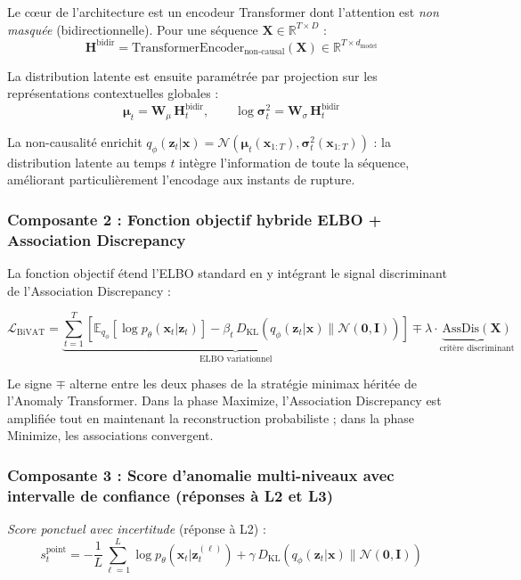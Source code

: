 \documentclass[12pt,a4paper]{article}
\begin{document}
Le cœur de l'architecture est un encodeur Transformer dont l'attention est \textit{non masquée} (bidirectionnelle). Pour une séquence $\mathbf{X} \in \mathbb{R}^{T \times D}$ :
$$\mathbf{H}^{\mathrm{bidir}} = \mathrm{TransformerEncoder}_{\mathrm{non\text{-}causal}}(\mathbf{X}) \in \mathbb{R}^{T \times d_{\mathrm{model}}}$$

La distribution latente est ensuite paramétrée par projection sur les représentations contextuelles globales :
$$\boldsymbol{\mu}_t = \mathbf{W}_\mu\,\mathbf{H}^{\mathrm{bidir}}_t, \qquad \log\boldsymbol{\sigma}^2_t = \mathbf{W}_\sigma\,\mathbf{H}^{\mathrm{bidir}}_t$$

La non-causalité enrichit $q_\phi(\mathbf{z}_t|\mathbf{x}) = \mathcal{N}(\boldsymbol{\mu}_t(\mathbf{x}_{1:T}), \boldsymbol{\sigma}^2_t(\mathbf{x}_{1:T}))$ : la distribution latente au temps $t$ intègre l'information de toute la séquence, améliorant particulièrement l'encodage aux instants de rupture.

\subsubsection{Composante 2 : Fonction objectif hybride ELBO + Association Discrepancy}

La fonction objectif étend l'ELBO standard en y intégrant le signal discriminant de l'Association Discrepancy :

$$\mathcal{L}_{\mathrm{BiVAT}} = \underbrace{\sum_{t=1}^T\left[\mathbb{E}_{q_\phi}[\log p_\theta(\mathbf{x}_t|\mathbf{z}_t)] - \beta_t\,D_{\mathrm{KL}}(q_\phi(\mathbf{z}_t|\mathbf{x})\|\mathcal{N}(\mathbf{0},\mathbf{I}))\right]}_{\text{ELBO variationnel}} \mp \lambda\cdot\underbrace{\mathrm{AssDis}(\mathbf{X})}_{\text{critère discriminant}}$$

Le signe $\mp$ alterne entre les deux phases de la stratégie minimax héritée de l'Anomaly Transformer. Dans la phase Maximize, l'Association Discrepancy est amplifiée tout en maintenant la reconstruction probabiliste ; dans la phase Minimize, les associations convergent.

\subsubsection{Composante 3 : Score d'anomalie multi-niveaux avec intervalle de confiance (réponses à L2 et L3)}

\textit{Score ponctuel avec incertitude} (réponse à L2) :
$$s^{\mathrm{point}}_t = -\frac{1}{L}\sum_{\ell=1}^L\log p_\theta(\mathbf{x}_t|\mathbf{z}_t^{(\ell)}) + \gamma\,D_{\mathrm{KL}}(q_\phi(\mathbf{z}_t|\mathbf{x})\|\mathcal{N}(\mathbf{0},\mathbf{I}))$$
\end{document}

